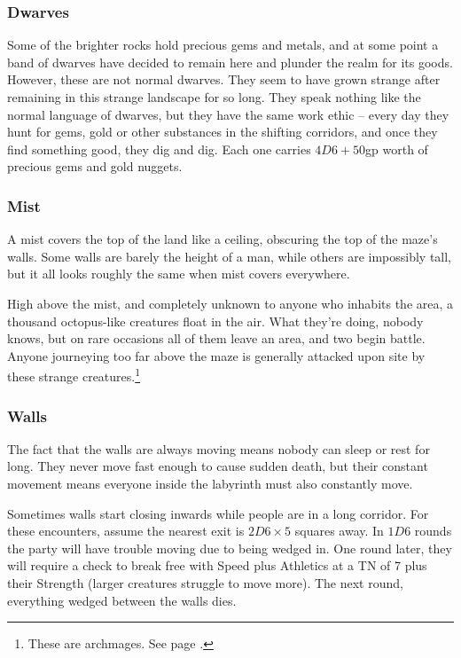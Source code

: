 \begin{multicols}{2}
\subsubsection{Dwarves}

Some of the brighter rocks hold precious gems and metals, and at some point a band of dwarves have decided to remain here and plunder the realm for its goods.
However, these are not normal dwarves.
They seem to have grown strange after remaining in this strange landscape for so long.
They speak nothing like the normal language of dwarves, but they have the same work ethic -- every day they hunt for gems, gold or other substances in the shifting corridors, and once they find something good, they dig and dig.
Each one carries $4D6 + 50$gp worth of precious gems and gold nuggets.

\subsubsection{Mist}

A mist covers the top of the land like a ceiling, obscuring the top of the maze's walls.  Some walls are barely the height of a man, while others are impossibly tall, but it all looks roughly the same when mist covers everywhere.

High above the mist, and completely unknown to anyone who inhabits the area, a thousand octopus-like creatures float in the air.
What they're doing, nobody knows, but on rare occasions all of them leave an area, and two begin battle.
Anyone journeying too far above the maze is generally attacked upon site by these strange creatures.\footnote{These are archmages. See page \pageref{archmage}.}

\subsubsection{Walls}

The fact that the walls are always moving means nobody can sleep or rest for long.
They never move fast enough to cause sudden death, but their constant movement means everyone inside the labyrinth must also constantly move.

Sometimes walls start closing inwards while people are in a long corridor.
For these encounters, assume the nearest exit is $2D6\times 5$ squares away.
In $1D6$ rounds the party will have trouble moving due to being wedged in.
One round later, they will require a check to break free with Speed plus Athletics at a TN of 7 plus their Strength (larger creatures struggle to move more).  The next round, everything wedged between the walls dies. 


\end{multicols}
